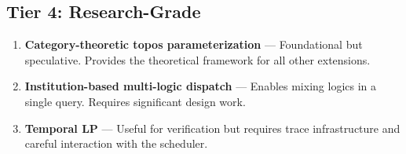 \documentclass[11pt]{article}
\begin{document}
\subsection{Tier 4: Research-Grade}
\label{sec:org9c5efb8}

\begin{enumerate}
\item \textbf{Category-theoretic topos parameterization} --- Foundational but speculative.
Provides the theoretical framework for all other extensions.

\item \textbf{Institution-based multi-logic dispatch} --- Enables mixing logics in a
single query. Requires significant design work.

\item \textbf{Temporal LP} --- Useful for verification but requires trace infrastructure
and careful interaction with the scheduler.
\end{enumerate}
\end{document}

